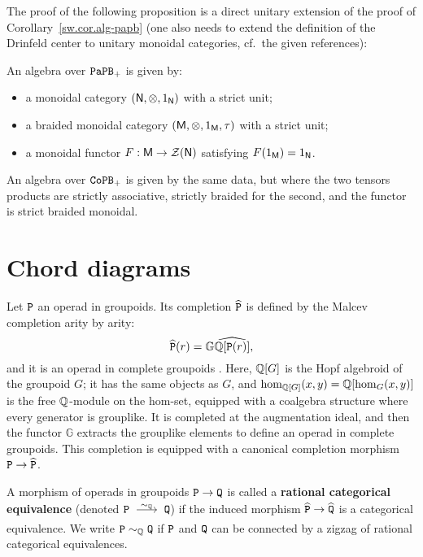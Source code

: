The proof of the following proposition is a direct unitary extension of the proof of Corollary~\ref{sw.cor.alg-papb} (one also needs to extend the definition of the Drinfeld center to unitary monoidal categories, cf.\ the given references):
\begin{proposition}
  An algebra over $\mathtt{PaPB}_{+}$ is given by:
  \begin{itemize}
  \item a monoidal category $(\mathsf{N}, \otimes, 1_{\mathsf{N}})$ with a strict unit;
  \item a braided monoidal category $(\mathsf{M}, \otimes, 1_{\mathsf{M}}, \tau)$ with a strict unit;
  \item a monoidal functor $F : \mathsf{M} \to \mathcal{Z}(\mathsf{N})$ satisfying $F(1_{\mathsf{M}}) = 1_{\mathsf{N}}$.
  \end{itemize}

  An algebra over $\mathtt{CoPB}_{+}$ is given by the same data, but where the two tensors products are strictly associative, strictly braided for the second, and the functor is strict braided monoidal.
\end{proposition}

\section{Chord diagrams}
\label{sw.sec.chord-diagrams}

Let $\mathtt{P}$ an operad in groupoids.
Its completion $\widehat{\mathtt{P}}$ is defined by the Malcev completion arity by arity:
\[ \widehat{\mathtt{P}}(r) = \mathbb{G} \widehat{\mathbb{Q}[\mathtt{P}(r)]}, \]
and it is an operad in complete groupoids \cite[§I.9]{Fresse2017}.
Here, $\mathbb{Q}[G]$ is the Hopf algebroid of the groupoid $G$; it has the same objects as $G$, and $\hom_{\mathbb{Q}[G]}(x,y) = \mathbb{Q}[\hom_{G}(x,y)]$ is the free $\mathbb{Q}$-module on the hom-set, equipped with a coalgebra structure where every generator is grouplike.
It is completed at the augmentation ideal, and then the functor $\mathbb{G}$ extracts the grouplike elements to define an operad in complete groupoids.
This completion is equipped with a canonical completion morphism $\mathtt{P} \to \widehat{\mathtt{P}}$.

\begin{definition}
  A morphism of operads in groupoids $\mathtt{P} \to \mathtt{Q}$ is called a \textbf{rational categorical equivalence} (denoted $\PP \tkrightarrow{\sim_{\Q}} \QQ$) if the induced morphism $\widehat{\mathtt{P}} \to \widehat{\mathtt{Q}}$ is a categorical equivalence.
  We write $\mathtt{P} \sim_{\mathbb{Q}} \mathtt{Q}$  if $\mathtt{P}$ and $\mathtt{Q}$ can be connected by a zigzag of rational categorical equivalences.
\end{definition}


